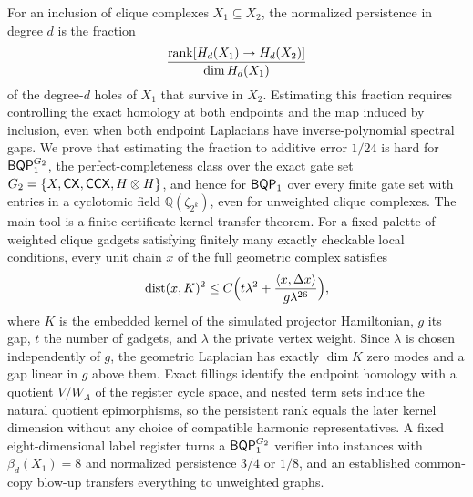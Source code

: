 For an inclusion of clique complexes \(X_1\subseteq X_2\), the normalized persistence in degree \(d\) is the fraction
\[
\frac{\operatorname{rank}[H_d(X_1)\to H_d(X_2)]}{\dim H_d(X_1)}
\]
of the degree-\(d\) holes of \(X_1\) that survive in \(X_2\). Estimating this fraction requires controlling the exact homology at both endpoints and the map induced by inclusion, even when both endpoint Laplacians have inverse-polynomial spectral gaps.
We prove that estimating the fraction to additive error \(1/24\) is hard for \(\mathsf{BQP}_{1}^{G_2}\), the perfect-completeness class over the exact gate set \(G_2=\{X,\mathsf{CX},\mathsf{CCX},H\otimes H\}\), and hence for \(\mathsf{BQP}_{1}\) over every finite gate set with entries in a cyclotomic field \(\mathbb Q(\zeta_{2^k})\), even for unweighted clique complexes.
The main tool is a finite-certificate kernel-transfer theorem. For a fixed palette of weighted clique gadgets satisfying finitely many exactly checkable local conditions, every unit chain \(x\) of the full geometric complex satisfies
\[
\operatorname{dist}(x,K)^2\le C\Bigl(t\lambda^2+\frac{\langle x,\Delta x\rangle}{g\lambda^{26}}\Bigr),
\]
where \(K\) is the embedded kernel of the simulated projector Hamiltonian, \(g\) its gap, \(t\) the number of gadgets, and \(\lambda\) the private vertex weight. Since \(\lambda\) is chosen independently of \(g\), the geometric Laplacian has exactly \(\dim K\) zero modes and a gap linear in \(g\) above them. Exact fillings identify the endpoint homology with a quotient \(V/W_A\) of the register cycle space, and nested term sets induce the natural quotient epimorphisms, so the persistent rank equals the later kernel dimension without any choice of compatible harmonic representatives. A fixed eight-dimensional label register turns a \(\mathsf{BQP}_{1}^{G_2}\) verifier into instances with \(\beta_d(X_1)=8\) and normalized persistence \(3/4\) or \(1/8\), and an established common-copy blow-up transfers everything to unweighted graphs.
